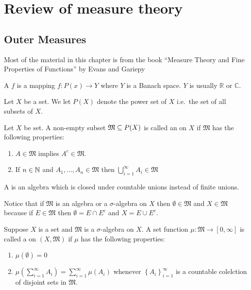 \chapter{Review of measure theory}

\section{Outer Measures}
\label{sec:measure_theory}

Most of the material in this chapter is from the book ``Measure Theory
and Fine Properties of Functions'' by Evans and Gariepy
\cite{evans1991measure}

\begin{defn}
  A  $f$ is a mapping $f:P(x) \to Y$ where $Y$ is a
  Banach space. $Y$ is usually $\mathbb{R}$ or $\mathbb{C}$.
\end{defn}

\begin{defn}
  Let $X$ be a set. We let $P(X)$ denote the power set of $X$ i.e.\ the
  set of all subsets of $X$.
\end{defn}

\begin{defn}
  Let $X$ be set. A non-empty subset $\mathfrak{M}\subseteq P(X)$ is called an
   on $X$ if $\mathfrak{M}$ has the following properties:
  \begin{enumerate}
    \item $A\in \mathfrak{M}$ implies $A^c\in \mathfrak{M}$.
    \item If $n\in \mathbb{N}$ and $A_1,\ldots,A_n\in \mathfrak{M}$ then $
      \bigcup_{i=1}^\infty A_i\in \mathfrak{M}$
  \end{enumerate}
  A  is an algebra which is closed under countable
  unions instead of finite unions.
\end{defn}

\begin{remark}
  Notice that if $\mathfrak{M}$ is an algebra or a $\sigma$-algebra on
  $X$ then $\emptyset\in \mathfrak{M}$ and $X\in \mathfrak{M}$ because
  if $E\in \mathfrak{M}$ then $\emptyset = E\cap E^{c}$ and $X = E\cup
  E^c$.
\end{remark}

\begin{defn}
  Suppose $X$ is a set and $\mathfrak{M}$ is a $\sigma$-algebra on
  $X$. A set function $\mu: \mathfrak{M} \to [0,\infty]$ is called a
   on $(X, \mathfrak{M})$ if $\mu$ has the following
  properties:
  \begin{enumerate}
    \item $\mu(\emptyset)=0$
    \item $\mu\left( \sum_{i=1}^\infty A_i \right) =
      \sum_{i=1}^\infty\mu(A_i)$ whenever $\left\{ A_i
      \right\}_{i=1}^\infty$ is a countable colelction of disjoint sets
      in $ \mathfrak{M}$.
  \end{enumerate}
\end{defn}

